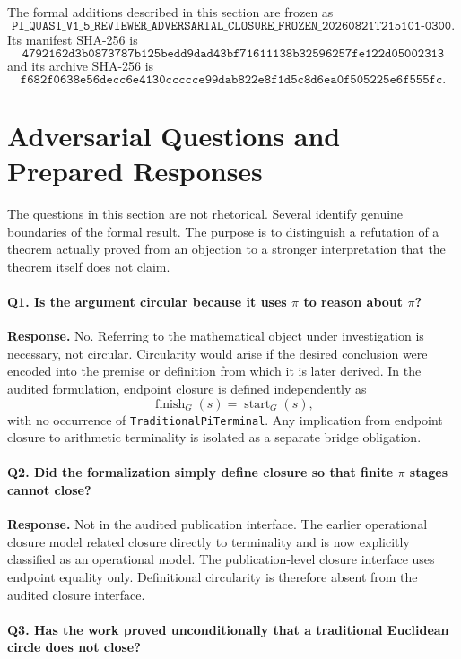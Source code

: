 \documentclass[11pt,a4paper]{article}
\begin{document}
The formal additions described in this section are frozen as
\[
\texttt{
PI\_QUASI\_V1\_5\_REVIEWER\_ADVERSARIAL\_CLOSURE\_FROZEN\_
20260821T215101-0300}.
\]
Its manifest SHA-256 is
\[
\texttt{
4792162d3b0873787b125bedd9dad43bf71611138b32596257fe122d05002313
}
\]
and its archive SHA-256 is
\[
\texttt{
f682f0638e56decc6e4130ccccce99dab822e8f1d5c8d6ea0f505225e6f555fc
}.
\]


\section{Adversarial Questions and Prepared Responses}

The questions in this section are not rhetorical. Several identify
genuine boundaries of the formal result. The purpose is to distinguish
a refutation of a theorem actually proved from an objection to a
stronger interpretation that the theorem itself does not claim.

\paragraph{Q1. Is the argument circular because it uses \(\pi\) to reason about \(\pi\)?}

\textbf{Response.}
No. Referring to the mathematical object under investigation is
necessary, not circular. Circularity would arise if the desired
conclusion were encoded into the premise or definition from which it
is later derived. In the audited formulation, endpoint closure is
defined independently as
\[
\operatorname{finish}_{G}(s)=\operatorname{start}_{G}(s),
\]
with no occurrence of \texttt{TraditionalPiTerminal}. Any implication
from endpoint closure to arithmetic terminality is isolated as a
separate bridge obligation.

\paragraph{Q2. Did the formalization simply define closure so that finite \(\pi\) stages cannot close?}

\textbf{Response.}
Not in the audited publication interface. The earlier operational
closure model related closure directly to terminality and is now
explicitly classified as an operational model. The publication-level
closure interface uses endpoint equality only. Definitional
circularity is therefore absent from the audited closure interface.

\paragraph{Q3. Has the work proved unconditionally that a traditional Euclidean circle does not close?}
\end{document}
